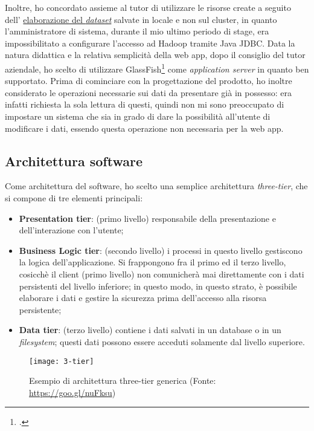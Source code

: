 Inoltre, ho concordato assieme al tutor di utilizzare le risorse create a seguito dell' \hyperref[dataseta]{elaborazione del \textit{dataset}} salvate in locale e non sul \gls{cluster}, in quanto l'amministratore di sistema, durante il mio ultimo periodo di stage, era impossibilitato a configurare l'accesso ad Hadoop tramite \gls{Java JDBC}. 
Data la natura didattica e la relativa semplicità della \gls{web app}, dopo il consiglio del tutor aziendale, ho scelto di utilizzare GlassFish\footcite{https://javaee.github.io/glassfish/} come \textit{application server} in quanto ben supportato.
Prima di cominciare con la progettazione del prodotto, ho inoltre considerato le operazioni necessarie sui dati da presentare già in possesso: era infatti richiesta la sola lettura di questi, quindi non mi sono preoccupato di impostare un sistema che sia in grado di dare la possibilità all'utente di modificare i dati, essendo questa operazione non necessaria per la \gls{web app}.

\subsection{Architettura software}
Come architettura del software, ho scelto una semplice architettura \textit{three-tier}, che si compone di tre elementi principali:
\begin{itemize}
	\item \textbf{Presentation tier}: (primo livello) responsabile della presentazione e dell'interazione con l'utente; 
	\item \textbf{Business Logic tier}: (secondo livello) i processi in questo livello gestiscono la logica dell'applicazione. Si frappongono fra il primo ed il terzo livello, cosicchè il client (primo livello) non comunicherà mai direttamente con i dati persistenti del livello inferiore; in questo modo, in questo strato, è possibile elaborare i dati e gestire la sicurezza prima dell'accesso alla risorsa persistente;
	\item \textbf{Data tier}: (terzo livello) contiene i dati salvati in un database o in un \textit{filesystem}; questi dati possono essere acceduti solamente dal livello superiore.
\end{itemize}

\begin{figure}[!h]
	\centering
	\texttt{[image: 3-tier]}
	\caption{Esempio di architettura three-tier generica (Fonte: \href{https://goo.gl/nuFksu}{https://goo.gl/nuFksu})}
\end{figure}

